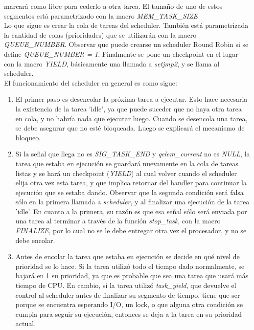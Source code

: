 \documentclass[a4paper]{article}
\begin{document}
marcará como libre para cederlo a otra tarea. El tamaño de uno de
estos segmentos está parametrizado con la macro \textit{MEM\_TASK\_SIZE}\\
Lo que sigue es crear la cola de tareas del scheduler. También está
parametrizada la cantidad de colas (prioridades) que se utilizarán
con la macro \textit{QUEUE\_NUMBER}. Observar que puede crearse un
scheduler Round Robin si se define \textit{QUEUE\_NUMBER = 1}. Finalmente
se pone un checkpoint en el lugar con la macro \textit{YIELD},
básicamente una llamada a \textit{setjmp2}, y se llama al scheduler.\\
El funcionamiento del scheduler en general es como sigue:
\begin{enumerate}
    \item El primer paso es desencolar la pr\'oxima tarea a ejecutar.
    Esto hace necesaria la existencia de la tarea 'idle', ya que puede
    suceder que no haya otra tarea en cola, y no habr\'ia nada que
    ejecutar luego. Cuando se desencola una tarea, se debe asegurar que
    no est\'e bloqueada. Luego se explicar\'a el mecanismo de bloqueo.
    \item Si la señal que llega no es \textit{SIG\_TASK\_END} y
    \textit{qelem\_current} no es \textit{NULL}, la tarea que estaba
    en ejecución se guardará nuevamente en la cola de tareas listas
    y se hará un checkpoint (\textit{YIELD}) al cual volver cuando
    el scheduler elija otra vez esta tarea, y que implica retornar
    del handler para continuar la ejecución que se estaba dando.
    Observar que la segunda condición será falsa sólo en la primera
    llamada a \textit{scheduler}, y al finalizar una ejecuci\'on de
    la tarea 'idle'. En cuanto a la primera, su razón es
    que esa señal sólo será enviada por una tarea al terminar a
    través de la función \textit{stop\_task}, con la macro
    \textit{FINALIZE}, por lo cual no se le debe entregar otra
    vez el procesador, y no se debe encolar.
    \item Antes de encolar la tarea que estaba en ejecución se decide
    en qué nivel de prioridad se lo hace. Si la tarea utilizó todo
    el tiempo dado normalmente, se bajará en 1 su prioridad, ya que
    es probable que sea una tarea que usará más tiempo de CPU.
    En cambio, si la tarea utilizó \textit{task\_yield}, que devuelve
    el control al scheduler antes de finalizar su segmento de tiempo,
    tiene que ser porque se encuentra esperando I/O, un lock, o que
    alguna otra condición se cumpla para seguir su ejecución,
    entonces se deja a la tarea en su prioridad actual.

\end{enumerate}
\end{document}
